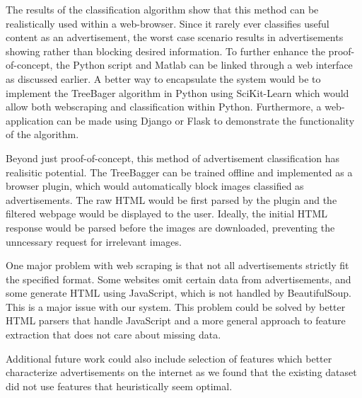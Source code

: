 The results of the classification algorithm show that this method can be realistically used within a web-browser. Since it rarely ever classifies useful content as an advertisement, the worst case scenario results in advertisements showing rather than blocking desired information. To further enhance the proof-of-concept, the Python script and Matlab can be linked through a web interface as discussed earlier. A better way to encapsulate the system would be to implement the TreeBager algorithm in Python using SciKit-Learn which would allow both webscraping and classification within Python. Furthermore, a web-application can be made using Django or Flask to demonstrate the functionality of the algorithm. 

Beyond just proof-of-concept, this method of advertisement classification has realisitic potential. The TreeBagger can be trained offline and implemented as a browser plugin, which would automatically block images classified as advertisements. The raw HTML would be first parsed by the plugin and the filtered webpage would be displayed to the user. Ideally, the initial HTML response would be parsed before the images are downloaded, preventing the unncessary request for irrelevant images. 

One major problem with web scraping is that not all advertisements strictly fit the specified format. Some websites omit certain data from advertisements, and some generate HTML using JavaScript, which is not handled by BeautifulSoup. This is a major issue with our system. This problem could be solved by better HTML parsers that handle JavaScript and a more general approach to feature extraction that does not care about missing data.

Additional future work could also include selection of features which better characterize advertisements on the internet as we found that the existing dataset did not use features that heuristically seem optimal.